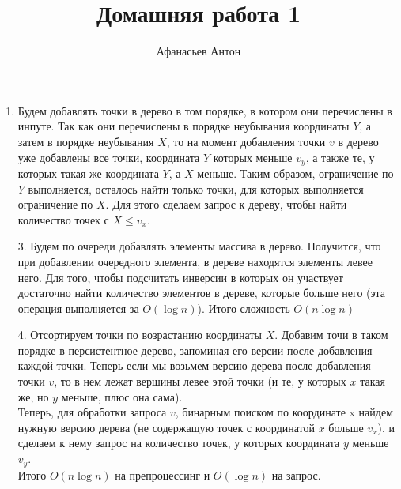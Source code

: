 \documentclass[10pt]{article}
\begin{document}
\title{Домашняя работа 1}
\author{Афанасьев Антон}
\maketitle

\begin{enumerate}

	\item Будем добавлять точки в дерево в том порядке, в котором они перечислены в инпуте. Так как они перечислены в порядке неубывания координаты $Y$, а затем в порядке неубывания $X$, то на момент добавления точки $v$ в дерево уже добавлены все точки, координата $Y$ которых меньше $v_y$, а также те, у которых такая же координата $Y$, а $X$ меньше. Таким образом, ограничение по $Y$ выполняется, осталось найти только точки, для которых выполняется ограничение по $X$. Для этого сделаем запрос к дереву, чтобы найти количество точек с $X \leq v_x$.
	
	\item[3.] Будем по очереди добавлять элементы массива в дерево. Получится, что при добавлении очередного элемента, в дереве находятся элементы левее него. Для того, чтобы подсчитать инверсии в которых он участвует достаточно найти количество элементов в дереве, которые больше него (эта операция выполняется за $O(\log n)$). Итого сложность $O(n \log n)$
	
	\item[4.] Отсортируем точки по возрастанию координаты $X$. Добавим точи в таком порядке в персистентное дерево, запоминая его версии после добавления каждой точки. Теперь если мы возьмем версию дерева после добавления точки $v$, то в нем лежат вершины левее этой точки (и те, у которых $x$ такая же, но $y$ меньше, плюс она сама).\\
	Теперь, для обработки запроса $v$, бинарным поиском по координате x найдем нужную версию дерева (не содержащую точек с координатой $x$ больше $v_x$), и сделаем к нему запрос на количество точек, у которых координата $y$ меньше $v_y$.\\
	Итого $O(n \log n)$ на препроцессинг и $O(\log n)$ на запрос.

\end{enumerate}
\end{document}
